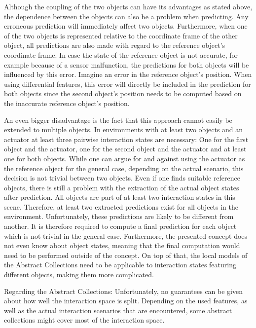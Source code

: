 Although the coupling of the two objects can have its advantages as stated above, the dependence between the objects can also be a problem when predicting. Any erroneous prediction will immediately affect two objects. 
Furthermore, when one of the two objects is represented relative to the coordinate frame of the other object, all predictions are also made with regard to the reference object's coordinate frame. 
In case the state of the reference object is not accurate, for example because of a sensor malfunction, the predictions for both objects will be influenced by this error. Imagine an error in the reference object's position. When using differential features, this error will directly be included in the prediction for both objects since the second object's position needs to be computed based on the inaccurate reference object's position.

An even bigger disadvantage is the fact that this approach cannot easily be extended to multiple objects. In environments with at least two objects and an actuator at least three pairwise interaction states are necessary: One for the first object and the actuator, one for the second object and the actuator and at least one for both objects. 
While one can argue for and against using the actuator as the reference object for the general case, depending on the actual scenario, this decision is not trivial between two objects. 
Even if one finds suitable reference objects, there is still a problem with the extraction of the actual object states after prediction. All objects are part of at least two interaction states in this scene. Therefore, at least two extracted predictions exist for all objects in the environment. Unfortunately, these predictions are likely to be different from another. It is therefore required to compute a final prediction for each object which is not trivial in the general case. Furthermore, the presented concept does not even know about object states, meaning that the final computation would need to be performed outside of the concept.
On top of that, the local models of the Abstract Collections need to be applicable to interaction states featuring different objects, making them more complicated.

Regarding the Abstract Collections:
Unfortunately, no guarantees can be given about how well the interaction space is split. Depending on the used features, as well as the actual interaction scenarios that are encountered, some abstract collections might cover most of the interaction space. 

